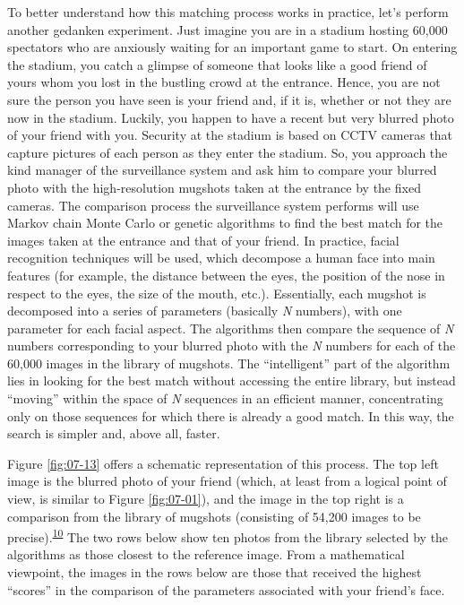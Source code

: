 To better understand how this matching process works in practice, let's perform another
gedanken experiment. Just imagine you are in a stadium hosting 60,000 spectators who are
anxiously waiting for an important game to start. On entering the stadium, you catch a
glimpse of someone that looks like a good friend of yours whom you lost in the bustling
crowd at the entrance. Hence, you are not sure the person you have seen is your friend
and, if it is, whether or not they are now in the stadium. Luckily, you happen to have a
recent but very blurred photo of your friend with you. Security at the stadium is based
on CCTV cameras that capture pictures of each person as they enter the stadium. So, you
approach the kind manager of the surveillance system and ask him to compare your blurred
photo with the high-resolution mugshots taken at the entrance by the fixed cameras. The
comparison process the surveillance system performs will use Markov chain Monte Carlo or
genetic algorithms to find the best match for the images taken at the entrance and that
of your friend. In practice, facial recognition techniques will be used, which decompose
a human face into main features (for example, the distance between the eyes, the
position of the nose in respect to the eyes, the size of the mouth, etc.). Essentially,
each mugshot is decomposed into a series of parameters (basically \emph{N} numbers),
with one parameter for each facial aspect. The algorithms then compare the sequence of
\emph{N} numbers corresponding to your blurred photo with the \emph{N} numbers for each
of the 60,000 images in the library of mugshots. The ``intelligent'' part of the
algorithm lies in looking for the best match without accessing the entire library, but
instead ``moving'' within the space of \emph{N} sequences in an efficient manner,
concentrating only on those sequences for which there is already a good match. In this
way, the search is simpler and, above all, faster.

Figure \ref{fig:07-13} offers a schematic representation of this process. The top left image is the
blurred photo of your friend (which, at least from a logical point of view, is similar
to Figure \ref{fig:07-01}), and the image in the top right is a comparison from the library of
mugshots (consisting of 54,200 images to be precise).\textsuperscript{\hyperlink{note:07-10}{10}} The two rows
below show ten photos from the library selected by the algorithms as those closest to
the reference image. From a mathematical viewpoint, the images in the rows below are
those that received the highest ``scores'' in the comparison of the parameters
associated with your friend's face.

